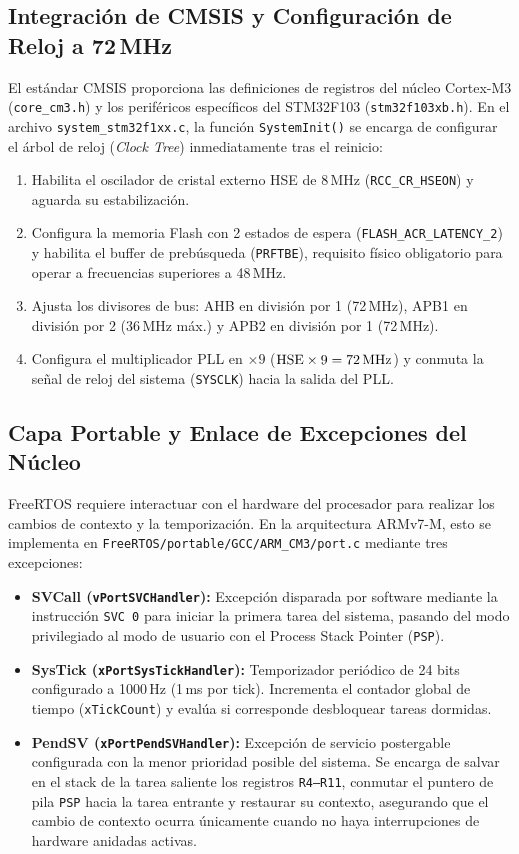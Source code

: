 \documentclass{plantilla}
\begin{document}
\subsection{Integración de CMSIS y Configuración de Reloj a 72\,MHz}
El estándar CMSIS proporciona las definiciones de registros del núcleo Cortex-M3 (\texttt{core\_cm3.h}) y los periféricos específicos del STM32F103 (\texttt{stm32f103xb.h}). En el archivo \texttt{system\_stm32f1xx.c}, la función \texttt{SystemInit()} se encarga de configurar el árbol de reloj (\textit{Clock Tree}) inmediatamente tras el reinicio:
\begin{enumerate}
    \item Habilita el oscilador de cristal externo HSE de 8\,MHz (\texttt{RCC\_CR\_HSEON}) y aguarda su estabilización.
    \item Configura la memoria Flash con 2 estados de espera (\texttt{FLASH\_ACR\_LATENCY\_2}) y habilita el buffer de prebúsqueda (\texttt{PRFTBE}), requisito físico obligatorio para operar a frecuencias superiores a 48\,MHz.
    \item Ajusta los divisores de bus: AHB en división por 1 (72\,MHz), APB1 en división por 2 (36\,MHz máx.) y APB2 en división por 1 (72\,MHz).
    \item Configura el multiplicador PLL en $\times 9$ ($\text{HSE} \times 9 = 72\text{\,MHz}$) y conmuta la señal de reloj del sistema (\texttt{SYSCLK}) hacia la salida del PLL.
\end{enumerate}

\subsection{Capa Portable y Enlace de Excepciones del Núcleo}
FreeRTOS requiere interactuar con el hardware del procesador para realizar los cambios de contexto y la temporización. En la arquitectura ARMv7-M, esto se implementa en \texttt{FreeRTOS/portable/GCC/ARM\_CM3/port.c} mediante tres excepciones:
\begin{itemize}
    \item \textbf{SVCall (\texttt{vPortSVCHandler}):} Excepción disparada por software mediante la instrucción \texttt{SVC 0} para iniciar la primera tarea del sistema, pasando del modo privilegiado al modo de usuario con el Process Stack Pointer (\texttt{PSP}).
    \item \textbf{SysTick (\texttt{xPortSysTickHandler}):} Temporizador periódico de 24 bits configurado a 1000\,Hz (1\,ms por tick). Incrementa el contador global de tiempo (\texttt{xTickCount}) y evalúa si corresponde desbloquear tareas dormidas.
    \item \textbf{PendSV (\texttt{xPortPendSVHandler}):} Excepción de servicio postergable configurada con la menor prioridad posible del sistema. Se encarga de salvar en el stack de la tarea saliente los registros \texttt{R4--R11}, conmutar el puntero de pila \texttt{PSP} hacia la tarea entrante y restaurar su contexto, asegurando que el cambio de contexto ocurra únicamente cuando no haya interrupciones de hardware anidadas activas.
\end{itemize}
\end{document}
